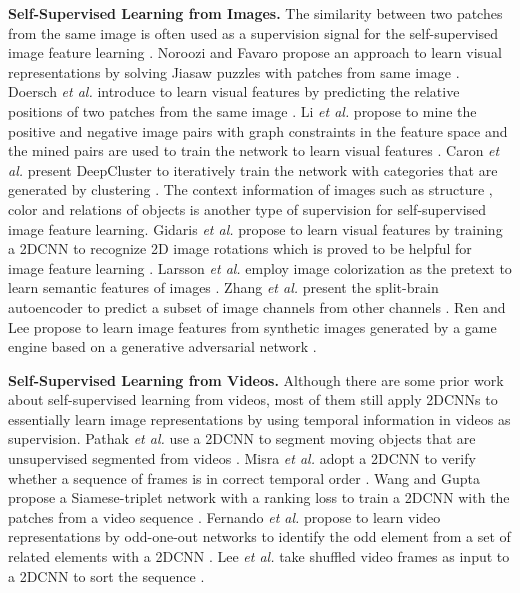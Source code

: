 \documentclass[10pt,twocolumn,letterpaper]{article}
\begin{document}
\textbf{Self-Supervised Learning from Images.} The similarity between two patches from the same image is often used as a supervision signal for the self-supervised image feature learning \cite{contextprediction, contrasting, graphconstraint, jigsaw}. Noroozi and Favaro propose an approach to learn visual representations by solving Jiasaw puzzles with  patches from same image \cite{jigsaw}. Doersch \textit{et al.} introduce to learn visual features by predicting the relative positions of two patches from the same image \cite{contextprediction}. Li \textit{et al.} propose to mine the positive and negative image pairs with graph constraints in the feature space and the mined pairs are used to train the network to learn visual features \cite{graphconstraint}. Caron \textit{et al.} present DeepCluster to iteratively train the network with categories that are generated by clustering \cite{deepcluster}. The context information of images such as structure \cite{inpainting}, color \cite{larsson2017colorproxy} and relations of objects is another type of supervision for self-supervised image feature learning. Gidaris \textit{et al.} propose to learn visual features by training a 2DCNN to recognize 2D image rotations which is proved to be helpful for image feature learning \cite{rotation}. Larsson \textit{et al.} employ image colorization as the pretext to learn semantic features of images \cite{larsson2017colorproxy}. Zhang \textit{et al.} present the split-brain autoencoder to predict a subset of image channels from other channels \cite{splitbrain}. Ren and Lee propose to learn image features from synthetic images generated by a game engine based on a generative adversarial network \cite{SynGAN}.

\textbf{Self-Supervised Learning from Videos.}
Although there are some prior work about self-supervised learning from videos, most of them still apply 2DCNNs to essentially learn image representations by using temporal information in videos as supervision. Pathak \textit{et al.} use a 2DCNN to segment moving objects that are unsupervised segmented from videos \cite{watchingmove}. Misra \textit{et al.} adopt a 2DCNN to verify whether a sequence of frames is in correct temporal order \cite{shuffleandlearn}. Wang and Gupta propose a Siamese-triplet network with a ranking loss to train a 2DCNN with the patches from a video sequence \cite{wang2015unsupervised}. Fernando \textit{et al.} propose to learn video representations by odd-one-out networks to identify the odd element from a set of related elements with a 2DCNN \cite{O3N}. Lee \textit{et al.} take shuffled video frames as input to a 2DCNN to sort the sequence \cite{OPN}.
\end{document}
